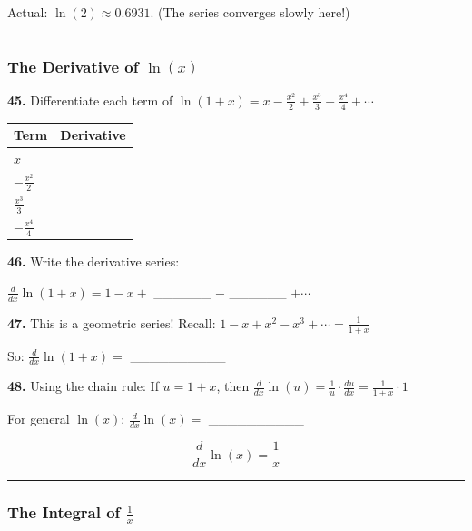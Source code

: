 \documentclass[
  11pt,
]{article}
\begin{document}
Actual: \(\ln(2) \approx 0.6931\). (The series converges slowly here!)

\begin{center}\rule{0.5\linewidth}{0.5pt}\end{center}

\hypertarget{the-derivative-of-lnx}{%
\subsubsection{\texorpdfstring{The Derivative of
\(\ln(x)\)}{The Derivative of \textbackslash ln(x)}}\label{the-derivative-of-lnx}}

\textbf{45.} Differentiate each term of
\(\ln(1+x) = x - \frac{x^2}{2} + \frac{x^3}{3} - \frac{x^4}{4} + \cdots\)

\begin{longtable}[]{@{}ll@{}}
\toprule\noalign{}
Term & Derivative \\
\midrule\noalign{}
\endhead
\bottomrule\noalign{}
\endlastfoot
\(x\) & \\
\(-\frac{x^2}{2}\) & \\
\(\frac{x^3}{3}\) & \\
\(-\frac{x^4}{4}\) & \\
\end{longtable}

\textbf{46.} Write the derivative series:

\(\frac{d}{dx}\ln(1+x) = 1 - x +{}\) \_\_\_\_\_\_ \(-\) \_\_\_\_\_\_
\(+ \cdots\)

\textbf{47.} This is a geometric series! Recall:
\(1 - x + x^2 - x^3 + \cdots = \frac{1}{1+x}\)

So: \(\frac{d}{dx}\ln(1+x) ={}\) \_\_\_\_\_\_\_\_\_\_

\textbf{48.} Using the chain rule: If \(u = 1 + x\), then
\(\frac{d}{dx}\ln(u) = \frac{1}{u} \cdot \frac{du}{dx} = \frac{1}{1+x} \cdot 1\)

For general \(\ln(x)\): \(\frac{d}{dx}\ln(x) ={}\) \_\_\_\_\_\_\_\_\_\_

\[\boxed{\frac{d}{dx}\ln(x) = \frac{1}{x}}\]

\begin{center}\rule{0.5\linewidth}{0.5pt}\end{center}

\hypertarget{the-integral-of-frac1x}{%
\subsubsection{\texorpdfstring{The Integral of
\(\frac{1}{x}\)}{The Integral of \textbackslash frac\{1\}\{x\}}}\label{the-integral-of-frac1x}}
\end{document}
